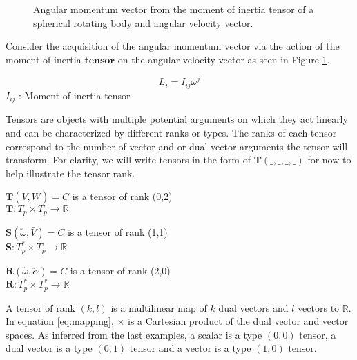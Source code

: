 \documentclass[11pt]{article}
\begin{document}
\begin{figure} [h!]
\begin{centering}
\caption{Angular momentum vector from the moment of inertia tensor of a spherical rotating body and angular velocity vector.}
\label{fig:ang_mo_figure}
		\end{centering}
		\end{figure}

\begin{example} 
Consider the acquisition of the angular momentum vector via the action of the moment of inertia $\boldsymbol{tensor}$ on the angular velocity vector as seen in Figure \ref{fig:ang_mo_figure}.
		
		\begin{equation}
		L_{i} = I_{ij}\omega^{j}
		\label{eq:angular_momentum}
		\end{equation}
		$I_{ij}$ : Moment of inertia tensor
	\end{example}
	Tensors are objects with multiple potential arguments on which they act linearly and can be characterized by different ranks or types. The ranks of each tensor correspond to the number of vector and or dual vector arguments the tensor will transform. For clarity, we will write tensors in the form of $\boldsymbol{T}(\_,\_,\_,\_)$ for now to help illustrate the tensor rank.
		\begin{example}
		$\boldsymbol{T}(\bar{V},\bar{W}) = C$ is a tensor of rank (0,2)\\
		$\boldsymbol{T}: T_{p} \times T_{p} \to \mathbb{R}$
		\end{example}
		
		\begin{example}
		$\boldsymbol{S}(\utilde{\omega},\bar{V}) = C$ is a tensor of rank (1,1)\\
		$\boldsymbol{S} : T^{*} _{p} \times T_{p} \to \mathbb{R}$
		\end{example}
		
		\begin{example}
		$\boldsymbol{R}(\utilde{\omega},\utilde{\alpha}) = C$ is a tensor of rank (2,0)\\
		$\boldsymbol{R} : T^{*} _{p} \times T^{*} _{p} \to \mathbb{R}$
		\end{example}
		
	A tensor of rank $(k,l)$ is a multilinear map of $k$ dual vectors and $l$ vectors to $\mathbb{R}$. In equation \eqref{eq:mapping}, $\times$ is a Cartesian product of the dual vector and vector spaces. As inferred from the last examples, a scalar is a type $(0,0)$ tensor, a dual vector is a type $(0,1)$ tensor and a vector is a type $(1,0)$ tensor.
	
\end{document}
